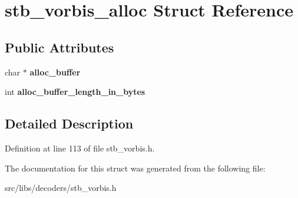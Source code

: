 \hypertarget{structstb__vorbis__alloc}{\section{stb\-\_\-vorbis\-\_\-alloc Struct Reference}
\label{structstb__vorbis__alloc}
}
\subsection*{Public Attributes}
\begin{DoxyCompactItemize}
\item 
\hypertarget{structstb__vorbis__alloc_a0bb516f56fb154f942d7c8641d33a26e}{char $\ast$ {\bfseries alloc\-\_\-buffer}}\label{structstb__vorbis__alloc_a0bb516f56fb154f942d7c8641d33a26e}

\item 
\hypertarget{structstb__vorbis__alloc_a04baf605f33de80c7161b27fb2ec5d86}{int {\bfseries alloc\-\_\-buffer\-\_\-length\-\_\-in\-\_\-bytes}}\label{structstb__vorbis__alloc_a04baf605f33de80c7161b27fb2ec5d86}

\end{DoxyCompactItemize}


\subsection{Detailed Description}


Definition at line 113 of file stb\-\_\-vorbis.\-h.



The documentation for this struct was generated from the following file\-:\begin{DoxyCompactItemize}
\item 
src/libs/decoders/stb\-\_\-vorbis.\-h\end{DoxyCompactItemize}
